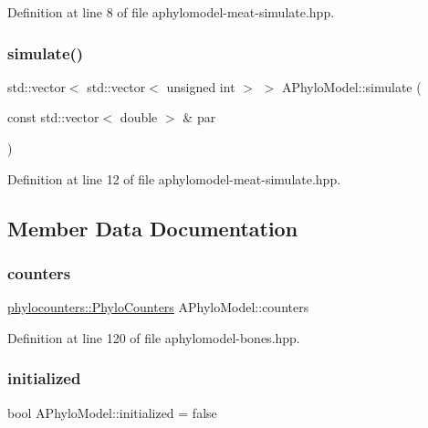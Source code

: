Definition at line 8 of file aphylomodel-\/meat-\/simulate.\+hpp.

\mbox{\label{class_a_phylo_model_ac75bb5a2f14d104733e2c194ae210986}} 
\subsubsection{\texorpdfstring{simulate()}{simulate()}}
{\footnotesize\ttfamily std\+::vector$<$ std\+::vector$<$ unsigned int $>$ $>$ A\+Phylo\+Model\+::simulate (\begin{DoxyParamCaption}\item[{const std\+::vector$<$ double $>$ \&}]{par }\end{DoxyParamCaption})\hspace{0.3cm}{\ttfamily [inline]}}



Definition at line 12 of file aphylomodel-\/meat-\/simulate.\+hpp.



\subsection{Member Data Documentation}
\mbox{\label{class_a_phylo_model_ac301d6887933072072bdf3472df5c8a3}} 
\subsubsection{\texorpdfstring{counters}{counters}}
{\footnotesize\ttfamily \hyperlink{namespacebarry_1_1counters_1_1phylo_a4e401ffe66d04091343dcffaf915f8c3}{phylocounters\+::\+Phylo\+Counters} A\+Phylo\+Model\+::counters}



Definition at line 120 of file aphylomodel-\/bones.\+hpp.

\mbox{\label{class_a_phylo_model_a298c38ef857994159589a6c0f7578150}} 
\subsubsection{\texorpdfstring{initialized}{initialized}}
{\footnotesize\ttfamily bool A\+Phylo\+Model\+::initialized = false}



